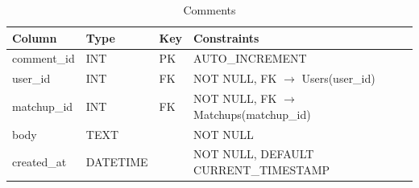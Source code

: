 \documentclass[11pt]{article}
\begin{document}
\begin{table}[ht]
\centering
\caption{Comments}
\begin{tabular}{|p{3.2cm}|p{3.8cm}|p{1.2cm}|p{5.3cm}|}
\hline
Column & Type & Key & Constraints \\ \hline
comment\_id & INT & PK & AUTO\_INCREMENT \\ \hline
user\_id & INT & FK & NOT NULL, FK $\rightarrow$ Users(user\_id) \\ \hline
matchup\_id & INT & FK & NOT NULL, FK $\rightarrow$ Matchups(matchup\_id) \\ \hline
body & TEXT &  & NOT NULL \\ \hline
created\_at & DATETIME &  & NOT NULL, DEFAULT CURRENT\_TIMESTAMP \\ \hline
\end{tabular}
\end{table}
\end{document}
